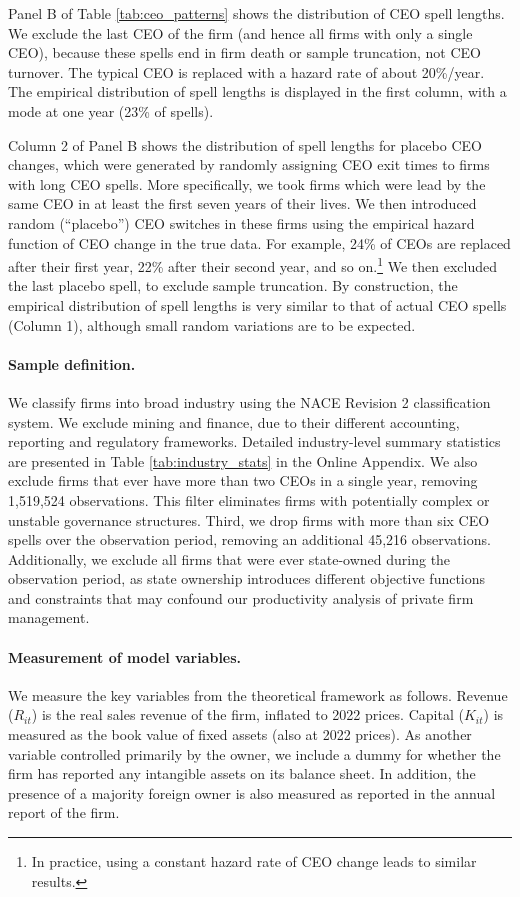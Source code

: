 Panel B of Table \ref{tab:ceo_patterns} shows the distribution of CEO spell lengths. We exclude the last CEO of the firm (and hence all firms with only a single CEO), because these spells end in firm death or sample truncation, not CEO turnover. The typical CEO is replaced with a hazard rate of about 20\%/year. The empirical distribution of spell lengths is displayed in the first column, with a mode at one year (23\% of spells).

Column 2 of Panel B shows the distribution of spell lengths for placebo CEO changes, which were generated by randomly assigning CEO exit times to firms with long CEO spells. More specifically, we took firms which were lead by the same CEO in at least the first seven years of their lives. We then introduced random (``placebo'') CEO switches in these firms using the empirical hazard function of CEO change in the true data. For example, 24\% of CEOs are replaced after their first year, 22\% after their second year, and so on.\footnote{In practice, using a constant hazard rate of CEO change leads to similar results.} We then excluded the last placebo spell, to exclude sample truncation. By construction, the empirical distribution of spell lengths is very similar to that of actual CEO spells (Column 1), although small random variations are to be expected.

\paragraph{Sample definition.} 
We classify firms into broad industry using the NACE Revision 2 classification system. We exclude mining and finance, due to their different accounting, reporting and regulatory frameworks. Detailed industry-level summary statistics are presented in Table \ref{tab:industry_stats} in the Online Appendix. We also exclude firms that ever have more than two CEOs in a single year, removing 1,519,524 observations. This filter eliminates firms with potentially complex or unstable governance structures. Third, we drop firms with more than six CEO spells over the observation period, removing an additional 45,216 observations. Additionally, we exclude all firms that were ever state-owned during the observation period, as state ownership introduces different objective functions and constraints that may confound our productivity analysis of private firm management.

\paragraph{Measurement of model variables.} We measure the key variables from the theoretical framework as follows. Revenue ($R_{it}$) is the real sales revenue of the firm, inflated to 2022 prices. Capital ($K_{it}$) is measured as the book value of fixed assets (also at 2022 prices). As another variable controlled primarily by the owner, we include a dummy for whether the firm has reported any intangible assets on its balance sheet. In addition, the presence of a majority foreign owner is also measured as reported in the annual report of the firm.

